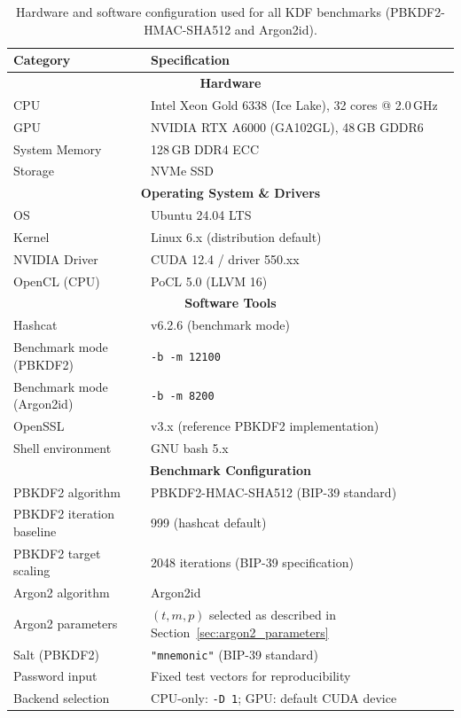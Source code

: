 \documentclass[journal,article,submit,pdftex,moreauthors]{Definitions/mdpi}
\begin{document}
\begin{table}[h]
\centering
\caption{Hardware and software configuration used for all KDF benchmarks (PBKDF2-HMAC-SHA512 and Argon2id).}
\label{tab:exp_setup}
\begin{tabular}{|l|l|}
\hline
\textbf{Category} & \textbf{Specification} \\
\hline
\multicolumn{2}{|c|}{\textbf{Hardware}} \\
\hline
CPU & Intel Xeon Gold 6338 (Ice Lake), 32 cores @ 2.0\,GHz \\
GPU & NVIDIA RTX A6000 (GA102GL), 48\,GB GDDR6 \\
System Memory & 128\,GB DDR4 ECC \\
Storage & NVMe SSD \\
\hline
\multicolumn{2}{|c|}{\textbf{Operating System \& Drivers}} \\
\hline
OS & Ubuntu 24.04 LTS \\
Kernel & Linux 6.x (distribution default) \\
NVIDIA Driver & CUDA 12.4 / driver 550.xx \\
OpenCL (CPU) & PoCL 5.0 (LLVM 16) \\
\hline
\multicolumn{2}{|c|}{\textbf{Software Tools}} \\
\hline
Hashcat & v6.2.6 (benchmark mode) \\
Benchmark mode (PBKDF2) & \texttt{-b -m 12100} \\
Benchmark mode (Argon2id) & \texttt{-b -m 8200} \\
OpenSSL & v3.x (reference PBKDF2 implementation) \\
Shell environment & GNU bash 5.x \\
\hline
\multicolumn{2}{|c|}{\textbf{Benchmark Configuration}} \\
\hline
PBKDF2 algorithm & PBKDF2-HMAC-SHA512 (BIP-39 standard) \\
PBKDF2 iteration baseline & 999 (hashcat default) \\
PBKDF2 target scaling & 2048 iterations (BIP-39 specification) \\
Argon2 algorithm & Argon2id \\
Argon2 parameters & $(t,m,p)$ selected as described in Section~\ref{sec:argon2_parameters} \\
Salt (PBKDF2) & \texttt{"mnemonic"} (BIP-39 standard) \\
Password input & Fixed test vectors for reproducibility \\
Backend selection & CPU-only: \texttt{-D 1}; GPU: default CUDA device \\
\hline
\end{tabular}
\end{table}
\end{document}
